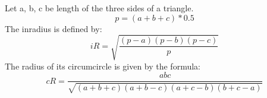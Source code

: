 Let a, b, c be length of the three sides of a triangle. $$ p = (a + b + c) * 0.5 $$
The inradius is defined by: $$ iR = \sqrt{\frac{(p - a)(p - b)(p - c)}{p}}$$
The radius of its circumcircle is given by the formula: $$ cR = \frac{abc}{\sqrt{(a + b + c)(a + b - c)(a + c - b)(b + c - a)}}$$
